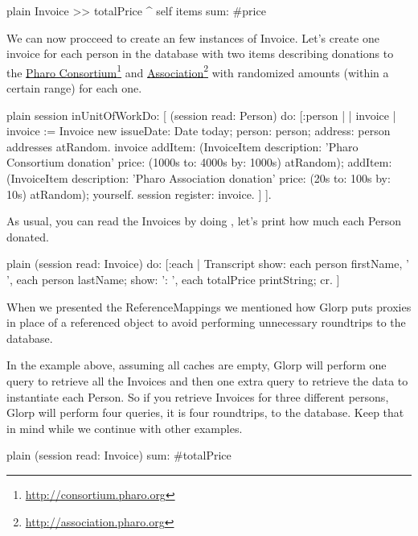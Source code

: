 \documentclass[10pt,twoside,english]{_support/latex/sbabook/sbabook}
\begin{document}
\begin{displaycode}{plain}
Invoice >> totalPrice
	^ self items sum: #price
\end{displaycode}

We can now procceed to create an few instances of Invoice. Let's create
one invoice for each person in the database with two items describing
donations to the \href{http://consortium.pharo.org}{Pharo Consortium}\footnote{\url{http://consortium.pharo.org}} and
\href{http://association.pharo.org}{Association}\footnote{\url{http://association.pharo.org}} with randomized amounts
(within a certain range) for each one.

\begin{displaycode}{plain}
session inUnitOfWorkDo: [
	(session read: Person) do: [:person |
		| invoice |
		invoice := Invoice new
			issueDate: Date today;
			person: person;
			address: person addresses atRandom.
		invoice
			addItem: (InvoiceItem
				description: 'Pharo Consortium donation'
		price: (1000s to: 4000s by: 1000s) atRandom);
			addItem: (InvoiceItem
				description: 'Pharo Association donation'
		price: (20s to: 100s by: 10s) atRandom); yourself.
		session register: invoice.
	]
].
\end{displaycode}

As usual, you can read the Invoices by doing , let's
print how much each Person donated.

\begin{displaycode}{plain}
(session read: Invoice) do: [:each |
	Transcript
		show: each person firstName, ' ', each person lastName;
		show: ': ', each totalPrice printString;
		cr.
]
\end{displaycode}

When we presented the ReferenceMappings we mentioned how Glorp puts proxies
in place of a referenced object to avoid performing unnecessary roundtrips
to the database.

In the example above, assuming all caches are empty, Glorp will perform one
query to retrieve all the Invoices and then one extra query to retrieve
the data to instantiate each Person. So if you retrieve Invoices for three
different persons, Glorp will perform four queries, it is four roundtrips,
to the database. Keep that in mind while we continue with other examples.

\begin{displaycode}{plain}
(session read: Invoice) sum: #totalPrice
\end{displaycode}
\end{document}
